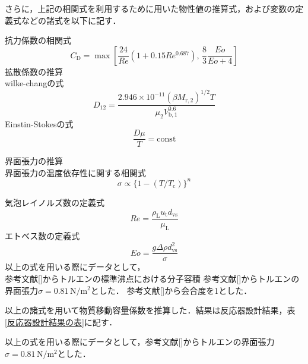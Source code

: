 \documentclass[a4j]{jsreport}
\begin{document}
さらに，上記の相関式を利用するために用いた物性値の推算式，および変数の定義式などの諸式を以下に記す．

抗力係数の相関式
\begin{equation}
    C_\mathrm{D} = \max \left[ \frac{24}{Re}(1+0.15Re^{0.687}), \, \frac{8}{3} \frac{Eo}{Eo+4} \right]
\end{equation}
拡散係数の推算\\
wilke-changの式
\begin{equation}
    D_{12} = \frac{2.946\times 10^{-11}(\beta M_{\mathrm{r,2}})^{1/2} T} {\mu_2 V_{\mathrm{b},1}^{0.6}}
\end{equation}
Einstin-Stokesの式
\begin{equation}
    \frac{D \mu}{T} = \text{const}
\end{equation}

界面張力の推算\\
界面張力の温度依存性に関する相関式
\begin{equation}
    \sigma \propto \{ 1-(T/T_\mathrm{c}) \}^n
\end{equation}

気泡レイノルズ数の定義式
\begin{equation}
    Re = \frac{\rho_\mathrm{L}u_\mathrm{t} d_\mathrm{vs}}{\mu_\mathrm{L}}
\end{equation}
エトベス数の定義式
\begin{equation}
    Eo = \frac{g \varDelta \rho d_\mathrm{vs}^2}{\sigma}
\end{equation}
以上の式を用いる際にデータとして，\\
参考文献[]からトルエンの標準沸点における分子容積
参考文献[]からトルエンの界面張力$\sigma=0.81 \,\si{\newton \per \square \metre}$とした．
参考文献[]から会合度を1とした．
\par
以上の諸式を用いて物質移動容量係数を推算した．結果は反応器設計結果，表\ref{反応器設計結果の表}に記す．

以上の式を用いる際にデータとして，参考文献[]からトルエンの界面張力$\sigma=0.81 \,\si{\newton \per \square \metre}$とした．
\end{document}
